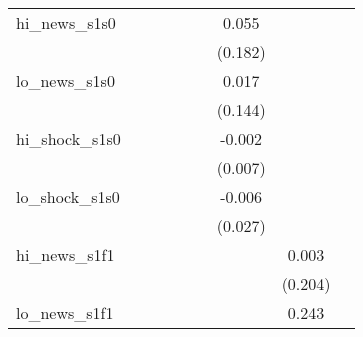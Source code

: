 {\begin{tabular}{l*{8}{c}}
\addlinespace
hi\_news\_s1s0&                     &                     &                     &                     &                     &       0.055         &                     &                     \\
            &                     &                     &                     &                     &                     &     (0.182)         &                     &                     \\
\addlinespace
lo\_news\_s1s0&                     &                     &                     &                     &                     &       0.017         &                     &                     \\
            &                     &                     &                     &                     &                     &     (0.144)         &                     &                     \\
\addlinespace
hi\_shock\_s1s0&                     &                     &                     &                     &                     &      -0.002         &                     &                     \\
            &                     &                     &                     &                     &                     &     (0.007)         &                     &                     \\
\addlinespace
lo\_shock\_s1s0&                     &                     &                     &                     &                     &      -0.006         &                     &                     \\
            &                     &                     &                     &                     &                     &     (0.027)         &                     &                     \\
\addlinespace
hi\_news\_s1f1&                     &                     &                     &                     &                     &                     &       0.003         &                     \\
            &                     &                     &                     &                     &                     &                     &     (0.204)         &                     \\
\addlinespace
lo\_news\_s1f1&                     &                     &                     &                     &                     &                     &       0.243         &                     \\

\end{tabular}}
